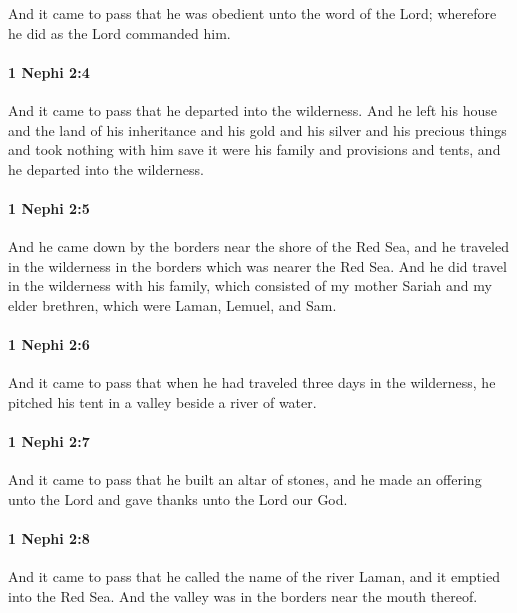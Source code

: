			And it came to pass that he was obedient unto the word of the Lord;
			wherefore he did as the Lord commanded him.

		\paragraph{1 Nephi 2:4} %
			\label{1NEPHI-2-4}

			And it came to pass that he departed into the wilderness.
			And he left his house and the land of his inheritance
			and his gold and his silver and his precious things
			and took nothing with him save it were his family and provisions and tents,
			and he departed into the wilderness.

		\paragraph{1 Nephi 2:5} %
			\label{1NEPHI-2-5}

			And he came down by the borders near the shore of the Red Sea,
			and he traveled in the wilderness in the borders which was nearer the Red Sea.
			And he did travel in the wilderness with his family,
			which consisted of my mother Sariah and my elder brethren,
			which were Laman, Lemuel, and Sam.

		\paragraph{1 Nephi 2:6} %
			\label{1NEPHI-2-6}

			And it came to pass that when he had traveled three days in the wilderness,
			he pitched his tent in a valley beside a river of water.

		\paragraph{1 Nephi 2:7} %
			\label{1NEPHI-2-7}

			And it came to pass that he built an altar of stones,
			and he made an offering unto the Lord and gave thanks unto the Lord our God.

		\paragraph{1 Nephi 2:8} %
			\label{1NEPHI-2-8}

			And it came to pass that he called the name of the river Laman,
			and it emptied into the Red Sea.
			And the valley was in the borders near the mouth thereof.

